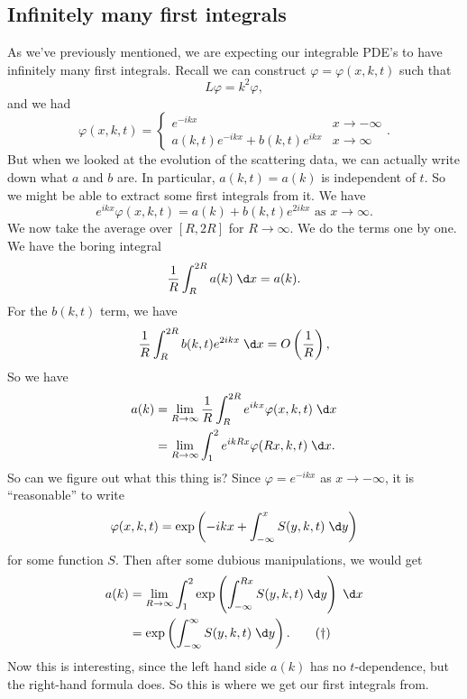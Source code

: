\documentclass[a4paper]{article}
\begin{document}
\subsection{Infinitely many first integrals}
As we've previously mentioned, we are expecting our integrable PDE's to have infinitely many first integrals. Recall we can construct $\varphi = \varphi(x, k, t)$ such that
\[
  L\varphi = k^2 \varphi,
\]
and we had
\[
  \varphi(x, k, t) =
  \begin{cases}
    e^{-ikx} & x \to -\infty\\
    a(k, t) e^{-ikx} + b(k, t) e^{ikx} & x \to \infty
  \end{cases}.
\]
But when we looked at the evolution of the scattering data, we can actually write down what $a$ and $b$ are. In particular, $a(k, t) = a(k)$ is independent of $t$. So we might be able to extract some first integrals from it. We have
\[
  e^{ikx} \varphi(x, k, t) = a(k) + b(k, t) e^{2ikx} \text{ as }x \to \infty.
\]
We now take the average over $[R, 2R]$ for $R \to \infty$. We do the terms one by one. We have the boring integral
\[
  \frac{1}{R} \int_R^{2R} a(k) \;\d x = a(k).
\]
For the $b(k, t)$ term, we have
\[
  \frac{1}{R} \int_R^{2R} b(k, t) e^{2ikx} \;\d x = O\left(\frac{1}{R}\right),
\]
So we have
\begin{align*}
  a(k) &= \lim_{R \to \infty} \frac{1}{R} \int_R^{2R} e^{ikx} \varphi(x, k, t) \;\d x\\
  &= \lim_{R \to \infty} \int_1^2 e^{ikRx} \varphi(Rx, k, t) \;\d x.
\end{align*}
So can we figure out what this thing is? Since $\varphi = e^{-ikx}$ as $x \to -\infty$, it is ``reasonable'' to write
\[
  \varphi(x, k, t) = \exp\left(-ikx + \int_{-\infty}^x S(y, k, t)\;\d y\right)
\]
for some function $S$. Then after some dubious manipulations, we would get
\begin{align*}
  a(k) &= \lim_{R \to \infty} \int_1^2 \exp\left(\int_{-\infty}^{Rx} S(y, k, t)\;\d y\right)\;\d x\\
  &= \exp\left(\int_{-\infty}^\infty S(y, k, t)\;\d y\right).\tag{$\dagger$}
\end{align*}
Now this is interesting, since the left hand side $a(k)$ has no $t$-dependence, but the right-hand formula does. So this is where we get our first integrals from.
\end{document}
